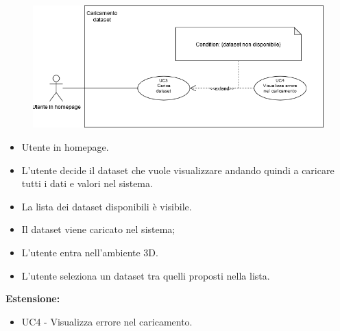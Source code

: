 \begin{figure}[h!]
    \centering
    \includegraphics[scale=0.6]{template/images/UC3.png}
    \caption{}
\end{figure}
    \UCdsc
    { %
        \begin{itemize}
            \item Utente in homepage.
        \end{itemize}
    }
    { %
        \begin{itemize}
            \item  L'utente decide il dataset che vuole visualizzare andando quindi a caricare tutti i dati e valori nel sistema.
        \end{itemize}
    }
    { %
        \begin{itemize}
            \item La lista dei dataset disponibili è visibile.
        \end{itemize}
    }
    { %
        \begin{itemize}
            \item Il dataset viene caricato nel sistema;
            \item L'utente entra nell'ambiente 3D.
        \end{itemize}
    }
    { %
        \begin{itemize}
            \item L'utente seleziona un dataset tra quelli proposti nella lista.
        \end{itemize}
        \item \textbf{Estensione:} \begin{itemize}
            \item UC4 - Visualizza errore nel caricamento.
        \end{itemize}
    }


